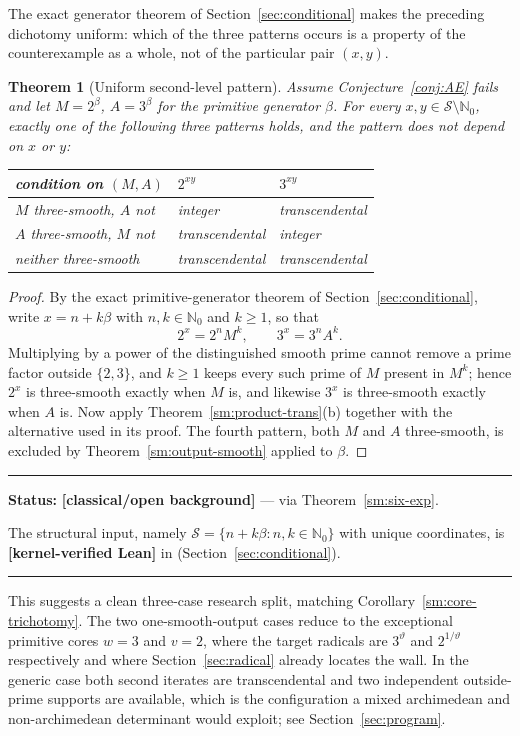 \documentclass[11pt,oneside]{article}
\newtheorem{theorem}{Theorem}[section]
\theoremstyle{definition}
\theoremstyle{remark}
\newcommand{\Nzero}{\mathbb N_0}
\newcommand{\thetaq}{\vartheta}
\newcommand{\Sol}{\mathcal S}
\newcommand{\lean}[1]{\texttt{\detokenize{#1}}}
\newcommand{\statuslean}{\textcolor{leanblue}{\textbf{[kernel-verified Lean]}}}
\newcommand{\statusknown}{\textcolor{classicalgray}{\textbf{[classical/\allowbreak open background]}}}
\newenvironment{statusbox}[1]
{\begin{center}\begin{minipage}{0.94\textwidth}\raggedright\hbadness=10000\hrule
\vspace{0.45em}\textbf{Status:} #1\par\vspace{0.35em}}
{\vspace{0.35em}\hrule\end{minipage}\end{center}}
\begin{document}
The exact generator theorem of Section~\ref{sec:conditional} makes the preceding dichotomy
uniform: which of the three patterns occurs is a property of the counterexample as a whole,
not of the particular pair $(x,y)$.

\begin{theorem}[Uniform second-level pattern]
\label{sm:uniform-second-level}
Assume Conjecture~\ref{conj:AE} fails and let $M=2^{\beta}$, $A=3^{\beta}$ for the primitive
generator $\beta$.  For every $x,y\in\Sol\setminus\Nzero$, exactly one of the following three
patterns holds, and the pattern does not depend on $x$ or $y$:
\begin{center}
\begin{tabular}{@{}p{}p{}p{}@{}}
\toprule
condition on $(M,A)$ & $2^{xy}$ & $3^{xy}$\\
\midrule
$M$ three-smooth, $A$ not & integer & transcendental\\
$A$ three-smooth, $M$ not & transcendental & integer\\
neither three-smooth & transcendental & transcendental\\
\bottomrule
\end{tabular}
\end{center}
\end{theorem}

\begin{proof}
By the exact primitive-generator theorem of Section~\ref{sec:conditional}, write
$x=n+k\beta$ with $n,k\in\Nzero$ and $k\ge1$, so that
\[
 2^x=2^nM^k,\qquad 3^x=3^nA^k .
\]
Multiplying by a power of the distinguished smooth prime cannot remove a prime factor
outside $\{2,3\}$, and $k\ge1$ keeps every such prime of $M$ present in $M^k$; hence $2^x$ is
three-smooth exactly when $M$ is, and likewise $3^x$ is three-smooth exactly when $A$ is.
Now apply Theorem~\ref{sm:product-trans}(b) together with the alternative used in its proof.
The fourth pattern, both $M$ and $A$ three-smooth, is excluded by
Theorem~\ref{sm:output-smooth} applied to $\beta$.
\end{proof}

\begin{statusbox}{\statusknown{} --- via Theorem~\ref{sm:six-exp}.}
The structural input, namely $\Sol=\{n+k\beta:n,k\in\Nzero\}$ with unique coordinates, is
\statuslean{} in \lean{PrimitiveGenerator} (Section~\ref{sec:conditional}).
\end{statusbox}

This suggests a clean three-case research split, matching
Corollary~\ref{sm:core-trichotomy}.  The two one-smooth-output cases reduce to the
exceptional primitive cores $w=3$ and $v=2$, where the target radicals are $3^{\thetaq}$ and
$2^{1/\thetaq}$ respectively and where Section~\ref{sec:radical} already locates the wall.
In the generic case both second iterates are transcendental and two independent
outside-prime supports are available, which is the configuration a mixed archimedean and
non-archimedean determinant would exploit; see Section~\ref{sec:program}.
\end{document}
